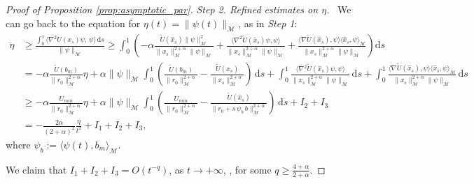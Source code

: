 \documentclass[a4paper,10pt]{amsart}
\newcommand{\ud}{\mathrm{d}}
\theoremstyle{plain}
\theoremstyle{definition}
\numberwithin{equation}{section}
\numberwithin{thm}{section}
\begin{document}
\begin{proof}[Proof of Proposition \ref{prop:asymptotic_par}]
\smallskip
\emph{Step 2. Refined estimates on $\eta$.} \ We can go back to the equation for $\eta(t)=\|\psi(t)\|_{\mathcal M}$, as in \textit{Step 1}:
\[
\begin{aligned}
\ddot \eta &\ge \frac{ \int_0^1 \langle \nabla^2 U(x_s)\psi, \, \psi \rangle \, \ud s}{\|\psi\|_\mathcal{M}} \ge \int_0^1 \left(-\alpha\frac{\tilde U(\hat x_s)\|\psi\|_\mathcal{M}^2}{\|x_s\|_\mathcal{M}^{2+\alpha}\|\psi\|_\mathcal{M}} + \frac{\langle\nabla^2 \tilde U(\hat x_s)\psi, \psi\rangle}{\|x_s\|_\mathcal{M}^{2+\alpha}\|\psi\|_\mathcal{M}} + \frac{\langle \nabla\tilde U(\hat x_s), \psi\rangle \langle \hat x_s, \psi\rangle_\mathcal{M}}{\|x_s\|_{\mathcal M}^{2+\alpha}\|\psi\|_\mathcal{M}}\right) \ud s
\\
&=-\alpha\frac{\tilde U(b_m)}{\|r_0\|_\mathcal{M}^{2+\alpha}} \eta + \alpha\|\psi\|_\mathcal{M}\int_0^1 \left(\frac{\tilde U(b_m)}{\|r_0\|_\mathcal{M}^{2+\alpha}} -\frac{\tilde U(\hat x_s)}{\|x_s\|_\mathcal{M}^{2+\alpha}}\right)\,\ud s + \int_0^1 \frac{\langle\nabla^2 \tilde U(\hat x_s)\psi, \psi\rangle}{\|x_s\|_\mathcal{M}^{2+\alpha}\|\psi\|_\mathcal{M}}\,\ud s +\int_0^1 \frac{\langle \nabla\tilde U(\hat x_s), \psi\rangle \langle \hat x_s, \psi\rangle_\mathcal{M}}{\|x_s\|_\mathcal{M}^{2+\alpha}\|\psi\|_\mathcal{M}}\, \ud s
\\
&{\ge -\alpha\frac{U_{min}}{\|r_0\|_\mathcal{M}^{2+\alpha}} \eta + \alpha\|\psi\|_\mathcal{M}\int_0^1 \left(\frac{U_{min}}{\|r_0\|_\mathcal{M}^{2+\alpha}} -\frac{\tilde U(\hat x_s)}{\|r_0+s\,\psi_b\,b\|_\mathcal{M}^{2+\alpha}}\right)\,\ud s + I_2+I_3}
\\
&=-\frac{2\alpha}{(2+\alpha)^2} \frac{\eta}{t^2} + I_1+I_2+I_3,
\end{aligned}
\]
where $\psi_b:=\langle \psi(t),b_m\rangle_{\mathcal M}$.

We claim that $I_1+I_2+I_3=O(t^{-q})$, as $t \rightarrow+\infty$, , for some $q \ge \frac{4+\alpha}{2+\alpha}$.


\end{proof}
\end{document}
